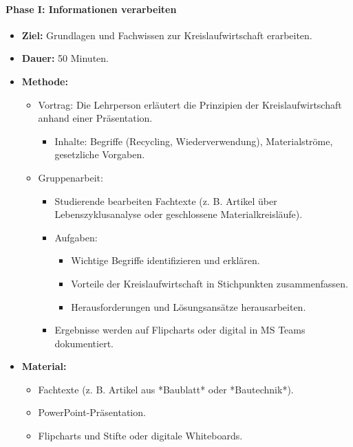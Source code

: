 \documentclass[
11pt,
captions=tableheading,
smallheadings,
headsepline,
footsepline, 
captions=tableheading,
parskip=half-,
]{scrartcl}
\begin{document}
\paragraph{Phase I: Informationen verarbeiten}
\begin{itemize}
    \item \textbf{Ziel:} Grundlagen und Fachwissen zur Kreislaufwirtschaft erarbeiten.
    \item \textbf{Dauer:} 50 Minuten.
    \item \textbf{Methode:}
          \begin{itemize}
              \item Vortrag: Die Lehrperson erläutert die Prinzipien der Kreislaufwirtschaft anhand einer Präsentation.
                    \begin{itemize}
                        \item Inhalte: Begriffe (Recycling, Wiederverwendung), Materialströme, gesetzliche Vorgaben.
                    \end{itemize}
              \item Gruppenarbeit:
                    \begin{itemize}
                        \item Studierende bearbeiten Fachtexte (z. B. Artikel über Lebenszyklusanalyse oder geschlossene Materialkreisläufe).
                        \item Aufgaben:
                              \begin{itemize}
                                  \item Wichtige Begriffe identifizieren und erklären.
                                  \item Vorteile der Kreislaufwirtschaft in Stichpunkten zusammenfassen.
                                  \item Herausforderungen und Lösungsansätze herausarbeiten.
                              \end{itemize}
                        \item Ergebnisse werden auf Flipcharts oder digital in MS Teams dokumentiert.
                    \end{itemize}
          \end{itemize}
    \item \textbf{Material:}
          \begin{itemize}
              \item Fachtexte (z. B. Artikel aus *Baublatt* oder *Bautechnik*).
              \item PowerPoint-Präsentation.
              \item Flipcharts und Stifte oder digitale Whiteboards.
          \end{itemize}
\end{itemize}
\end{document}
